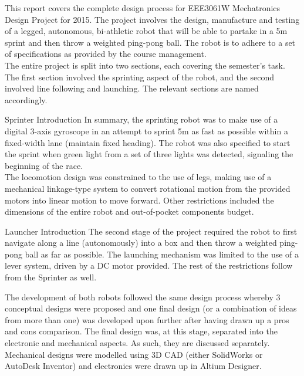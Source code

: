 \begin{homeworkProblem}[{Introduction}]
This report covers the complete design process for EEE3061W Mechatronics Design Project for 2015.  The project involves the design, manufacture and testing of a legged, autonomous, bi-athletic robot that will be able to partake in a 5m sprint and then throw a weighted ping-pong ball.  The robot is to adhere to a set of specifications as provided by the course management. \\

The entire project is split into two sections, each covering the semester's task.  The first section involved the sprinting aspect of the robot, and the second involved line following and launching.  The relevant sections are named accordingly.

  \begin{homeworkSection}{Sprinter Introduction}
    In summary, the sprinting robot was to make use of a digital 3-axis gyroscope in an attempt to sprint 5m as fast as possible within a fixed-width lane (maintain fixed heading).  The robot was also specified to start the sprint when green light from a set of three lights was detected, signaling the beginning of the race. \\

    The locomotion design was constrained to the use of legs, making use of a mechanical linkage-type system to convert rotational motion from the provided motors into linear motion to move forward.  Other restrictions included the dimensions of the entire robot and out-of-pocket components budget.
  \end{homeworkSection}

  \begin{homeworkSection}{Launcher Introduction}
    The second stage of the project required the robot to first navigate along a line (autonomously) into a box and then throw a weighted ping-pong ball as far as possible. The launching mechanism was limited to the use of a lever system, driven by a DC motor provided.  The rest of the restrictions follow from the Sprinter as well. \\
  \end{homeworkSection}

The development of both robots followed the same design process whereby 3 conceptual designs were proposed and one final design (or a combination of ideas from more than one) was developed upon further after having drawn up a pros and cons comparison.  The final design was, at this stage, separated into the electronic and mechanical aspects.  As such, they are discussed separately.  Mechanical designs were modelled using 3D CAD (either SolidWorks or AutoDesk Inventor) and electronics were drawn up in Altium Designer.
\end{homeworkProblem}

